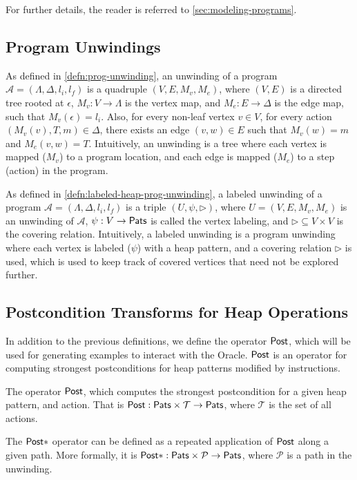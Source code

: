 For further details, the reader is referred to \autoref{sec:modeling-programs}.

\subsection{Program Unwindings}
As defined in \autoref{defn:prog-unwinding}, an unwinding of a program
$\mathcal{A} = (\Lambda, \Delta, l_i, l_f)$ is a quadruple $(V, E, M_v, M_e)$, where
$(V, E)$ is a directed tree rooted at $\epsilon$, $M_v : V \rightarrow \Lambda$ is the
vertex map, and $M_e : E \rightarrow \Delta$ is the edge map, such that
$M_v(\epsilon) = l_i$. Also, for every non-leaf vertex $v \in V$, for every action
$(M_v(v), T, m) \in \Delta$, there exists an edge $(v,w) \in E$ such that $M_v(w) = m$ and
$M_e(v,w) = T$. Intuitively, an unwinding is a tree where each vertex is mapped ($M_v$) to
a program location, and each edge is mapped ($M_e$) to a step (action) in the program.

As defined in \autoref{defn:labeled-heap-prog-unwinding}, a labeled unwinding of a program
$\mathcal{A} = (\Lambda, \Delta, l_i, l_f)$ is a triple $(U, \psi, \rhd)$, where
$U = (V, E, M_v, M_e)$ is an unwinding of $\mathcal{A}$, $\psi : V \to \mathsf{Pats}$ is
called the vertex labeling, and $\rhd \subseteq V \times V$ is the covering relation.
Intuitively, a labeled unwinding is a program unwinding where each vertex is labeled
($\psi$) with a heap pattern, and a covering relation $\rhd$ is used, which is used to
keep track of covered vertices that need not be explored further.

\subsection{Postcondition Transforms for Heap Operations}
In addition to the previous definitions, we define the operator $\mathsf{Post}$, which will be
used for generating examples to interact with the Oracle. $\mathsf{Post}$ is an operator for
computing strongest postconditions for heap patterns modified by \lang instructions.

\begin{defn}
  \label{defn:heap-post-transforms}
  The operator $\mathsf{Post}$, which computes the strongest postcondition for a given heap pattern, and action. That is $\mathsf{Post} : \mathsf{Pats} \times \mathcal{T} \to \mathsf{Pats}$, where $\mathcal{T}$ is the set of all actions.

  The $\mathsf{Post}{*}$ operator can be defined as a repeated application of $\mathsf{Post}$ along a given path. More formally, it is $\mathsf{Post}{*} : \mathsf{Pats} \times \mathcal{P} \to \mathsf{Pats}$, where $\mathcal{P}$ is a path in the unwinding.
\end{defn}

